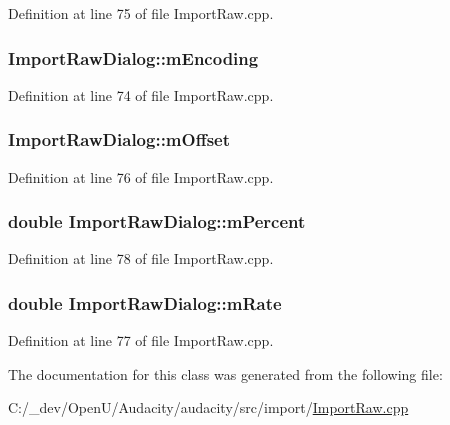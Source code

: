Definition at line 75 of file Import\+Raw.\+cpp.

\subsubsection[{\texorpdfstring{m\+Encoding}{mEncoding}}]{ Import\+Raw\+Dialog\+::m\+Encoding}\hypertarget{class_import_raw_dialog_a7aaacc84ce98c14d964c14a600fa3cdf}{}\label{class_import_raw_dialog_a7aaacc84ce98c14d964c14a600fa3cdf}


Definition at line 74 of file Import\+Raw.\+cpp.

\subsubsection[{\texorpdfstring{m\+Offset}{mOffset}}]{ Import\+Raw\+Dialog\+::m\+Offset}\hypertarget{class_import_raw_dialog_a23dfbecba3c61d894789a426f5a2d689}{}\label{class_import_raw_dialog_a23dfbecba3c61d894789a426f5a2d689}


Definition at line 76 of file Import\+Raw.\+cpp.

\subsubsection[{\texorpdfstring{m\+Percent}{mPercent}}]{\setlength{\rightskip}{0pt plus 5cm}double Import\+Raw\+Dialog\+::m\+Percent}\hypertarget{class_import_raw_dialog_ab2dd0f684803cd6a3809971ecda985e2}{}\label{class_import_raw_dialog_ab2dd0f684803cd6a3809971ecda985e2}


Definition at line 78 of file Import\+Raw.\+cpp.

\subsubsection[{\texorpdfstring{m\+Rate}{mRate}}]{\setlength{\rightskip}{0pt plus 5cm}double Import\+Raw\+Dialog\+::m\+Rate}\hypertarget{class_import_raw_dialog_a6f9270b0f94615df9ea9575550967bb3}{}\label{class_import_raw_dialog_a6f9270b0f94615df9ea9575550967bb3}


Definition at line 77 of file Import\+Raw.\+cpp.



The documentation for this class was generated from the following file\+:\begin{DoxyCompactItemize}
\item 
C\+:/\+\_\+dev/\+Open\+U/\+Audacity/audacity/src/import/\hyperlink{_import_raw_8cpp}{Import\+Raw.\+cpp}\end{DoxyCompactItemize}
